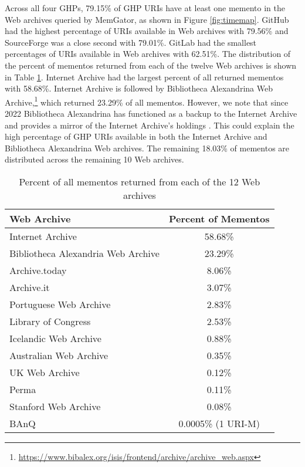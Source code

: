 Across all four GHPs, 79.15\% of GHP URIs have at least one memento in the Web archives queried by MemGator, as shown in Figure \ref{fig:timemap}. GitHub had the highest percentage of URIs available in Web archives with 79.56\% and SourceForge was a close second with 79.01\%. GitLab had the smallest percentages of URIs available in Web archives with 62.51\%. The distribution of the percent of mementos returned from each of the twelve Web archives is shown in Table \ref{tab:archives}. Internet Archive had the largest percent of all returned mementos with 58.68\%. Internet Archive is followed by Bibliotheca Alexandrina Web Archive,\footnote{\url{https://www.bibalex.org/isis/frontend/archive/archive\_web.aspx}} which returned 23.29\% of all mementos. However, we note that since 2022 Bibliotheca Alexandrina has functioned as a backup to the Internet Archive and provides a mirror of the Internet Archive's holdings \cite{bibalex-ia}. This could explain the high percentage of GHP URIs available in both the Internet Archive and Bibliotheca Alexandrina Web archives. The remaining 18.03\% of mementos are distributed across the remaining 10 Web archives. 

\begin{table}
    \centering
    \begin{tabular}{|l|c|}
    \hline
    Web Archive & Percent of Mementos \\
    \hline
    Internet Archive & 58.68\% \\
    Bibliotheca Alexandria Web Archive & 23.29\% \\
    Archive.today & 8.06\% \\
    Archive.it & 3.07\% \\
    Portuguese Web Archive & 2.83\% \\
    Library of Congress & 2.53\% \\
    Icelandic Web Archive & 0.88\% \\
    Australian Web Archive & 0.35\% \\
    UK Web Archive & 0.12\% \\
    Perma & 0.11\% \\
    Stanford Web Archive & 0.08\% \\
    BAnQ & 0.0005\% (1 URI-M) \\ \hline
    \end{tabular}
    \caption{Percent of all mementos returned from each of the 12 Web archives}
    \label{tab:archives}
\end{table}

